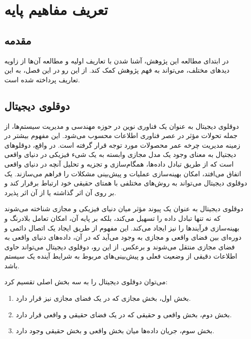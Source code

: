 
%

\chapter{تعریف مفاهیم پایه}
\section{مقدمه}
در ابتدای مطالعه این پژوهش، آشنا شدن با تعاریف اولیه و مطالعه آن‌ها از زاویه دید‌های مختلف، می‌تواند به فهم پژوهش کمک کند. از این رو در این فصل، به این تعاریف پرداخته شده است.
\section{دوقلوی دیجیتال}

دوقلوی دیجیتال به عنوان یک فناوری نوین در حوزه مهندسی و مدیریت سیستم‌ها، از جمله تحولات مؤثر در عصر فناوری اطلاعات محسوب می‌شود. این مفهوم بیشتر در زمینه مدیریت چرخه عمر محصولات
مورد توجه قرار گرفته است. 
در واقع، دوقلوهای دیجتیال به معنای وجود یک مدل مجازی وابسته به یک شیء فیزیکی در دنیای واقعی است که از طریق تبادل داده‌ها، همگام‌سازی و تجزیه و تحلیل آنچه در دنیای واقعی اتفاق می‌افتد، امکان بهینه‌سازی عملیات و پیش‌بینی مشکلات را فراهم می‌سازند. یک دوقلوی دیجیتال می‌تواند به روش‌های مختلفی با همتای حقیقی خود ارتباط برقرار کند و بر روی آن اثر گذاشته یا از آن اثر پذیرد.

دوقلوی دیجیتال به عنوان یک پیوند مؤثر میان دنیای فیزیکی و مجازی شناخته می‌شوند که نه تنها تبادل داده‌ را تسهیل می‌کند، بلکه بر پایه آن، امکان تعامل بلادرنگ و بهینه‌سازی فرآیندها را نیز ایجاد می‌کند.
\cite{b2}
این مفهوم از طریق ایجاد یک اتصال دائمی و دوره‌ای بین فضای واقعی و مجازی به وجود می‌آید که در آن، داده‌های دنیای واقعی به فضای مجازی منتقل می‌شوند و برعکس. 
از این رو، دوقلوی دیجیتال می‌تواند حاوی اطلاعات دقیقی از وضعیت فعلی و پیش‌بینی‌های مربوط به شرایط آینده یک سیستم باشد.

می‌توان دوقلوی دیجیتال را به سه بخش اصلی تقسیم کرد:
\cite{b2}
\begin{enumerate}
	\item 
	بخش اول، بخش مجازی که در یک فضای مجازی نیز قرار دارد.
	\item 
	بخش دوم، بخش واقعی و حقیقی که در یک فضای حقیقی و واقعی قرار دارد.
	\item 
	بخش سوم، جریان داده‌ها میان بخش واقعی و بخش حقیقی وجود دارد.
\end{enumerate}

